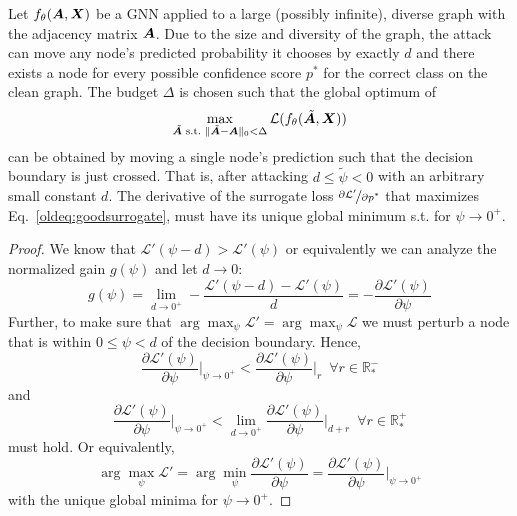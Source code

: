 \documentclass[sigconf,authordraft]{acmart}
\newcommand{\adj}{\mA}
\newcommand{\features}{\mX}
\begin{document}
\begin{theorem}\label{oldtheorem:goodsurrogate}
  Let \(f_{\theta}(\adj, \features)\) be a GNN applied to a large (possibly infinite), diverse graph with the adjacency matrix \(\adj\). Due to the size and diversity of the graph, the attack can move any node's predicted probability it chooses by exactly \(d\) and there exists a node for every possible confidence score \(p^*\) for the correct class on the clean graph. The budget \(\Delta\) is chosen such that the global optimum of
  \begin{equation}\label{oldeq:goodsurrogate}
    \max_{\tilde{\adj}\text{ s.t.\ }\|\tilde{\adj} - \adj\|_0 < \Delta} \mathcal{L}(f_{\theta}(\tilde{\adj}, \features))
  \end{equation}
  can be obtained by moving a single node's prediction such that the decision boundary is just crossed. That is, after attacking \(d \le \tilde{\psi} < 0\) with an arbitrary small constant \(d\). The derivative of the surrogate loss \(\nicefrac{\partial \mathcal{L}'}{\partial p^*}\) that maximizes Eq.~\ref{oldeq:goodsurrogate}, must have its unique global minimum s.t. for \(\psi \to 0^+\).
\end{theorem}

\begin{proof}
  We know that \(\mathcal{L}'(\psi - d) > \mathcal{L}'(\psi)\) or equivalently we can analyze the normalized gain \(g(\psi)\) and let \(d \to 0\): \[
    g(\psi) = \lim_{d \to 0^+} 
    -\frac{\mathcal{L}'(\psi - d) - \mathcal{L}'(\psi)}{d} = -\frac{\partial \mathcal{L}'(\psi)}{\partial \psi}
  \]
  Further, to make sure that \(\arg\max_\psi \mathcal{L}' = \arg\max_\psi \mathcal{L}\) we must perturb a node that is within \(0 \le \psi < d\) of the decision boundary. Hence,  \[
    \frac{\partial \mathcal{L}'(\psi)}{\partial \psi} \Big|_{\psi \to 0^+} < \frac{\partial \mathcal{L}'(\psi)}{\partial \psi} \Big|_{r}\,\,\,\forall r \in \mathbb{R}_*^-
  \] and \[
    \frac{\partial \mathcal{L}'(\psi)}{\partial \psi} \Big|_{\psi \to 0^+} < \lim_{d \to 0^+} \frac{\partial \mathcal{L}'(\psi)}{\partial \psi} \Big|_{d + r}\,\,\,\forall r \in \mathbb{R}_*^+
  \] must hold. Or equivalently, \[
    \arg\max_\psi \mathcal{L}' = \arg\min_\psi \frac{\partial \mathcal{L}'(\psi)}{\partial \psi} = \frac{\partial \mathcal{L}'(\psi)}{\partial \psi} \Big|_{\psi \to 0^+}
  \] with the unique global minima for \(\psi \to 0^+\). 
\end{proof}
\end{document}
